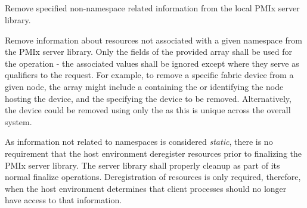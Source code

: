 \subsection{}

\summary

Remove specified non-namespace related information from the local \ac{PMIx} server library.

\format


\begin{arglist}
\end{arglist}

\descr

Remove information about resources not associated with a given namespace from the \ac{PMIx} server library. Only the  fields of the provided  array shall be used for the operation - the associated values shall be ignored except where they serve as qualifiers to the request. For example, to remove a specific fabric device from a given node, the  array might include a  containing the  or  identifying the node hosting the device, and the  specifying the device to be removed. Alternatively, the device could be removed using only the  as this is unique across the overall system.

\returnsimple

\advicermstart
As information not related to namespaces is considered \emph{static}, there is no requirement that the host environment deregister resources prior to finalizing the \ac{PMIx} server library. The server library shall properly cleanup as part of its normal finalize operations. Deregistration of resources is only required, therefore, when the host environment determines that client processes should no longer have access to that information.

